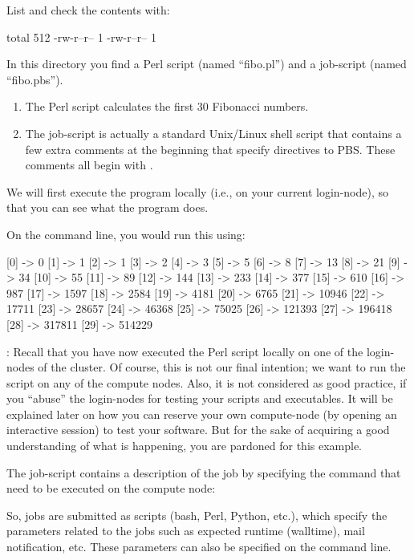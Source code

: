 List and check the contents with:

\begin{prompt}
total 512
-rw-r--r-- 1 %
-rw-r--r-- 1 %
\end{prompt}

In this directory you find a Perl script (named ``fibo.pl'') and a job-script
(named ``fibo.pbs'').

\begin{enumerate}
\item  The Perl script calculates the first 30 Fibonacci numbers.
\item  The job-script is actually a standard Unix/Linux shell script that
  contains a few extra comments at the beginning that specify directives to
  PBS.  These comments all begin with .
\end{enumerate}

We will first execute the program locally (i.e., on your current login-node),
so that you can see what the program does.

On the command line, you would run this using:
\begin{prompt}
[0] -> 0
[1] -> 1
[2] -> 1
[3] -> 2
[4] -> 3
[5] -> 5
[6] -> 8
[7] -> 13
[8] -> 21
[9] -> 34
[10] -> 55
[11] -> 89
[12] -> 144
[13] -> 233
[14] -> 377
[15] -> 610
[16] -> 987
[17] -> 1597
[18] -> 2584
[19] -> 4181
[20] -> 6765
[21] -> 10946
[22] -> 17711
[23] -> 28657
[24] -> 46368
[25] -> 75025
[26] -> 121393
[27] -> 196418
[28] -> 317811
[29] -> 514229
\end{prompt}

: Recall that you have now executed the Perl script locally on
one of the login-nodes of the \hpc cluster.  Of course, this is not our final
intention; we want to run the script on any of the compute nodes. Also, it is
not considered as good practice, if you ``abuse'' the login-nodes for testing
your scripts and executables. It will be explained later on how you can
reserve your own compute-node (by opening an interactive session) to test
your software. But for the sake of acquiring a good understanding of what is
happening, you are pardoned for this example.

The job-script contains a description of the job by specifying the command that
need to be executed on the compute node:


So, jobs are submitted as scripts (bash, Perl, Python, etc.), which specify the
parameters related to the jobs such as expected runtime (walltime), mail
notification, etc. These parameters can also be specified on the command line.

